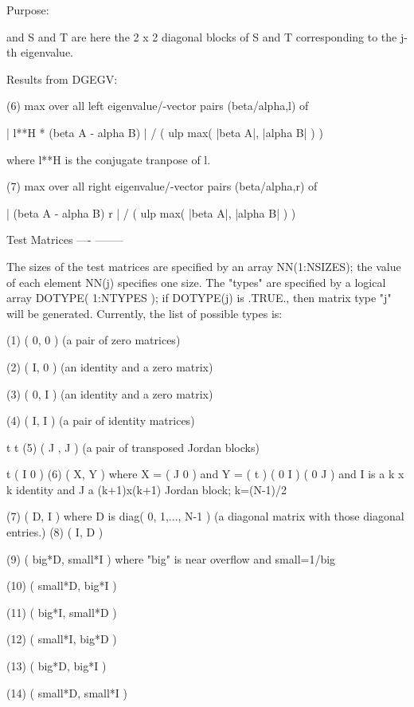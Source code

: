 \begin{DoxyParagraph}{Purpose\+: }
\begin{DoxyVerb}
           and S and T are here the 2 x 2 diagonal blocks of S and T
           corresponding to the j-th eigenvalue.

 Results from DGEGV:

 (6)   max over all left eigenvalue/-vector pairs (beta/alpha,l) of

    | l**H * (beta A - alpha B) | / ( ulp max( |beta A|, |alpha B| ) )

       where l**H is the conjugate tranpose of l.

 (7)   max over all right eigenvalue/-vector pairs (beta/alpha,r) of

       | (beta A - alpha B) r | / ( ulp max( |beta A|, |alpha B| ) )

 Test Matrices
 ---- --------

 The sizes of the test matrices are specified by an array
 NN(1:NSIZES); the value of each element NN(j) specifies one size.
 The "types" are specified by a logical array DOTYPE( 1:NTYPES ); if
 DOTYPE(j) is .TRUE., then matrix type "j" will be generated.
 Currently, the list of possible types is:

 (1)  ( 0, 0 )         (a pair of zero matrices)

 (2)  ( I, 0 )         (an identity and a zero matrix)

 (3)  ( 0, I )         (an identity and a zero matrix)

 (4)  ( I, I )         (a pair of identity matrices)

         t   t
 (5)  ( J , J  )       (a pair of transposed Jordan blocks)

                                     t                ( I   0  )
 (6)  ( X, Y )         where  X = ( J   0  )  and Y = (      t )
                                  ( 0   I  )          ( 0   J  )
                       and I is a k x k identity and J a (k+1)x(k+1)
                       Jordan block; k=(N-1)/2

 (7)  ( D, I )         where D is diag( 0, 1,..., N-1 ) (a diagonal
                       matrix with those diagonal entries.)
 (8)  ( I, D )

 (9)  ( big*D, small*I ) where "big" is near overflow and small=1/big

 (10) ( small*D, big*I )

 (11) ( big*I, small*D )

 (12) ( small*I, big*D )

 (13) ( big*D, big*I )

 (14) ( small*D, small*I )


\end{DoxyVerb}
\end{DoxyParagraph}
